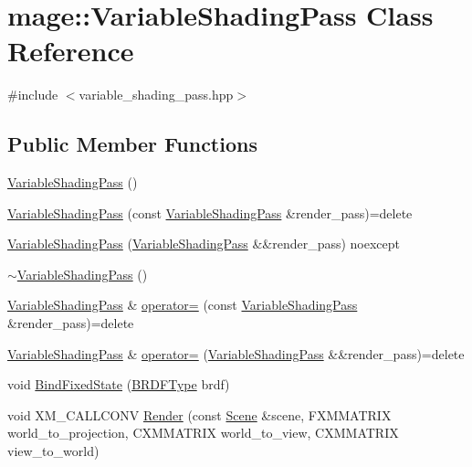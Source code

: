 \hypertarget{classmage_1_1_variable_shading_pass}{}\section{mage\+:\+:Variable\+Shading\+Pass Class Reference}
\label{classmage_1_1_variable_shading_pass}


{\ttfamily \#include $<$variable\+\_\+shading\+\_\+pass.\+hpp$>$}

\subsection*{Public Member Functions}
\begin{DoxyCompactItemize}
\item 
\hyperlink{classmage_1_1_variable_shading_pass_a0c3b30167c1dcdf74daae080f2c799bc}{Variable\+Shading\+Pass} ()
\item 
\hyperlink{classmage_1_1_variable_shading_pass_a98ce8bacba3894ff29d2a13d3a645d22}{Variable\+Shading\+Pass} (const \hyperlink{classmage_1_1_variable_shading_pass}{Variable\+Shading\+Pass} \&render\+\_\+pass)=delete
\item 
\hyperlink{classmage_1_1_variable_shading_pass_a214cdbab6685f4fc63130979cc247765}{Variable\+Shading\+Pass} (\hyperlink{classmage_1_1_variable_shading_pass}{Variable\+Shading\+Pass} \&\&render\+\_\+pass) noexcept
\item 
\hyperlink{classmage_1_1_variable_shading_pass_a1af7915285b239e8e6d14eb0f926dc4a}{$\sim$\+Variable\+Shading\+Pass} ()
\item 
\hyperlink{classmage_1_1_variable_shading_pass}{Variable\+Shading\+Pass} \& \hyperlink{classmage_1_1_variable_shading_pass_ad846c4f7ffc5b795ba1c0fa03bd6c2af}{operator=} (const \hyperlink{classmage_1_1_variable_shading_pass}{Variable\+Shading\+Pass} \&render\+\_\+pass)=delete
\item 
\hyperlink{classmage_1_1_variable_shading_pass}{Variable\+Shading\+Pass} \& \hyperlink{classmage_1_1_variable_shading_pass_a28702f255ccbbabd4b6e3177acd97a8b}{operator=} (\hyperlink{classmage_1_1_variable_shading_pass}{Variable\+Shading\+Pass} \&\&render\+\_\+pass)=delete
\item 
void \hyperlink{classmage_1_1_variable_shading_pass_a3a5bf4764bdafd393c73b75939f68aa0}{Bind\+Fixed\+State} (\hyperlink{namespacemage_af1044f87544bc38427766a8c795d2f26}{B\+R\+D\+F\+Type} brdf)
\item 
void X\+M\+\_\+\+C\+A\+L\+L\+C\+O\+NV \hyperlink{classmage_1_1_variable_shading_pass_afc3382f7732760c9bbbbdd51fab7c74c}{Render} (const \hyperlink{classmage_1_1_scene}{Scene} \&scene, F\+X\+M\+M\+A\+T\+R\+IX world\+\_\+to\+\_\+projection, C\+X\+M\+M\+A\+T\+R\+IX world\+\_\+to\+\_\+view, C\+X\+M\+M\+A\+T\+R\+IX view\+\_\+to\+\_\+world)

\end{DoxyCompactItemize}
